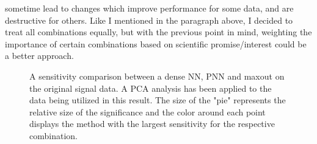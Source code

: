 sometime lead to changes which improve performance for some data, and are destructive for others. Like I mentioned in the paragraph above, I decided 
to treat all combinations equally, but with the previous point in mind, weighting the importance of certain combinations based on scientific promise/interest
could be a better approach. 
\begin{figure}
    \caption[A sensitivity comparison between a dense \ac{NN}, \ac{PNN} and maxout  on the original 
    signal data. A \ac{PCA} analysis has been applied to the data being utilized in this result.]{A sensitivity 
    comparison between a dense \ac{NN}, \ac{PNN} and maxout on the original 
    signal data. A \ac{PCA} analysis has been applied to the data being utilized in this result. The size of the 
    "pie" represents the relative size of the significance and the color around each point displays the method with 
    the largest sensitivity for the respective combination.}
    \label{fig:PCAComp}
\end{figure}
